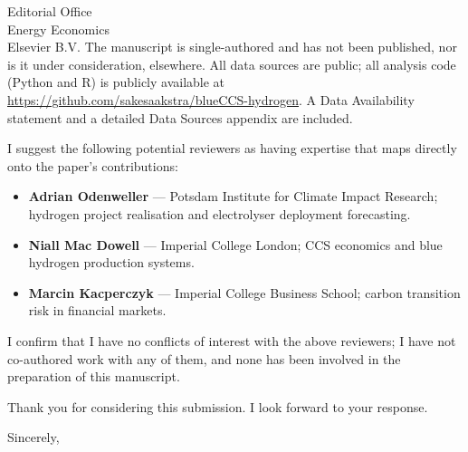 \documentclass[11pt,a4paper]{letter}
\begin{document}
\begin{letter}{Editorial Office \\ Energy Economics \\ Elsevier B.V.}
The manuscript is single-authored and has not been published, nor is it under consideration, elsewhere. All data sources are public; all analysis code (Python and R) is publicly available at \url{https://github.com/sakesaakstra/blueCCS-hydrogen}. A Data Availability statement and a detailed Data Sources appendix are included.

I suggest the following potential reviewers as having expertise that maps directly onto the paper's contributions:

\begin{itemize}
\setlength{\itemsep}{0pt}
\item \textbf{Adrian Odenweller} --- Potsdam Institute for Climate Impact Research; hydrogen project realisation and electrolyser deployment forecasting.
\item \textbf{Niall Mac Dowell} --- Imperial College London; CCS economics and blue hydrogen production systems.
\item \textbf{Marcin Kacperczyk} --- Imperial College Business School; carbon transition risk in financial markets.
\end{itemize}

I confirm that I have no conflicts of interest with the above reviewers; I have not co-authored work with any of them, and none has been involved in the preparation of this manuscript.

Thank you for considering this submission. I look forward to your response.

\closing{Sincerely,}

\end{letter}
\end{document}
